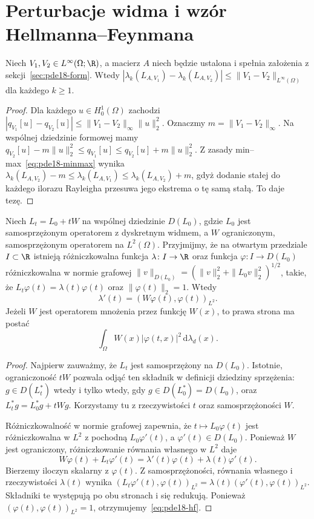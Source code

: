 \section{Perturbacje widma i wzór Hellmanna--Feynmana}
\label{sec:pde18-perturb}
\begin{wniosek}
Niech $V_1,V_2\in L^\infty(\Omega;\R)$, a macierz $A$
niech będzie ustalona i spełnia założenia z
sekcji~\ref{sec:pde18-form}.
Wtedy
$|\lambda_k(L_{A,V_1})-\lambda_k(L_{A,V_2})|
\le\|V_1-V_2\|_{L^\infty(\Omega)}$ dla każdego $k\ge1$.
\end{wniosek}
\begin{proof}
Dla każdego $u\in H_0^1(\Omega)$ zachodzi
$|q_{V_1}[u]-q_{V_2}[u]|
\le\|V_1-V_2\|_\infty\|u\|_2^2$.
Oznaczmy $m=\|V_1-V_2\|_\infty$. Na wspólnej
dziedzinie formowej mamy
$q_{V_2}[u]-m\|u\|_2^2\le q_{V_1}[u]
\le q_{V_2}[u]+m\|u\|_2^2$.
Z zasady min--max~\eqref{eq:pde18-minmax} wynika
$\lambda_k(L_{A,V_2})-m\le\lambda_k(L_{A,V_1})
\le\lambda_k(L_{A,V_2})+m$, gdyż dodanie stałej
do każdego ilorazu Rayleigha przesuwa jego ekstrema
o tę samą stałą. To daje tezę.
\end{proof}

\begin{stwierdzenie}
\label{prop:pde18-hf}
Niech $L_t=L_0+tW$ na wspólnej dziedzinie $D(L_0)$,
gdzie $L_0$ jest samosprzężonym operatorem z dyskretnym
widmem, a $W$ ograniczonym, samosprzężonym operatorem
na $L^2(\Omega)$.
Przyjmijmy, że na otwartym przedziale $I\subset\R$
istnieją różniczkowalna funkcja $\lambda\colon I\to\R$
oraz funkcja $\varphi\colon I\to D(L_0)$ różniczkowalna
w normie grafowej
$\|v\|_{D(L_0)}=(\|v\|_2^2+\|L_0v\|_2^2)^{1/2}$,
takie, że
$L_t\varphi(t)=\lambda(t)\varphi(t)$ oraz
$\|\varphi(t)\|_2=1$. Wtedy
\begin{equation}\label{eq:pde18-hf}
 \lambda'(t)=(W\varphi(t),\varphi(t))_{L^2}.
\end{equation}
Jeżeli $W$ jest operatorem mnożenia przez funkcję $W(x)$,
to prawa strona ma postać
\[
\int_\Omega W(x)|\varphi(t,x)|^2\,\mathrm d\lambda_d(x).
\]
\end{stwierdzenie}
\begin{proof}
Najpierw zauważmy, że $L_t$ jest samosprzężony
na $D(L_0)$. Istotnie, ograniczoność $tW$ pozwala
odjąć ten składnik w definicji dziedziny sprzężenia:
$g\in D(L_t^*)$ wtedy i tylko wtedy, gdy
$g\in D(L_0^*)=D(L_0)$, oraz
$L_t^*g=L_0^*g+tWg$. Korzystamy tu z rzeczywistości
$t$ oraz samosprzężoności $W$.

Różniczkowalność w normie grafowej zapewnia, że
$t\mapsto L_0\varphi(t)$ jest różniczkowalna w $L^2$
z pochodną $L_0\varphi'(t)$, a $\varphi'(t)\in D(L_0)$.
Ponieważ $W$ jest ograniczony, różniczkowanie równania
własnego w $L^2$ daje
\[
 W\varphi(t)+L_t\varphi'(t)
 =\lambda'(t)\varphi(t)+\lambda(t)\varphi'(t).
\]
Bierzemy iloczyn skalarny z $\varphi(t)$.
Z samosprzężoności, równania własnego i rzeczywistości
$\lambda(t)$ wynika
$(L_t\varphi'(t),\varphi(t))_{L^2}
=\lambda(t)(\varphi'(t),\varphi(t))_{L^2}$.
Składniki te występują po obu stronach i się redukują.
Ponieważ $(\varphi(t),\varphi(t))_{L^2}=1$,
otrzymujemy~\eqref{eq:pde18-hf}.
\end{proof}

